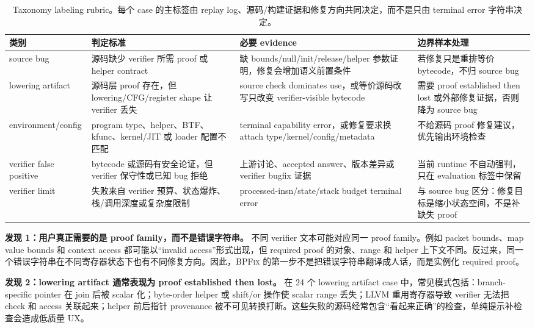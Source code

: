 \documentclass[letterpaper,twocolumn,10pt]{article}
\newcommand{\sys}{\textsc{BPFix}\xspace}
\begin{document}
\begin{table}[t]
\centering
\small
\caption{Taxonomy labeling rubric。每个 case 的主标签由 replay log、源码/构建证据和修复方向共同决定，而不是只由 terminal error 字符串决定。}
\label{tab:taxonomy-rubric}
\begin{tabularx}{\textwidth}{@{}l X X X@{}}
\toprule
类别 & 判定标准 & 必要 evidence & 边界样本处理 \\
\midrule
source bug & 源码缺少 verifier 所需 proof 或 helper contract & 缺 bounds/null/init/release/helper 参数证明，修复会增加语义前置条件 & 若修复只是重排等价 bytecode，不归 source bug \\
lowering artifact & 源码层 proof 存在，但 lowering/CFG/register shape 让 verifier 丢失 & source check dominates use，或等价源码改写只改变 verifier-visible bytecode & 需要 proof established then lost 或外部修复证据，否则降为 source bug \\
environment/config & program type、helper、BTF、kfunc、kernel/JIT 或 loader 配置不匹配 & terminal capability error，或修复要求换 attach type/kernel/config/metadata & 不给源码 proof 修复建议，优先输出环境检查 \\
verifier false positive & bytecode 或源码有安全论证，但 verifier 保守性或已知 bug 拒绝 & 上游讨论、accepted answer、版本差异或 verifier bugfix 证据 & 当前 runtime 不自动强判，只在 evaluation 标签中保留 \\
verifier limit & 失败来自 verifier 预算、状态爆炸、栈/调用深度或复杂度限制 & processed-insn/state/stack budget terminal error & 与 source bug 区分：修复目标是缩小状态空间，不是补缺失 proof \\
\bottomrule
\end{tabularx}
\end{table}

\textbf{发现 1：用户真正需要的是 proof family，而不是错误字符串。}
不同 verifier 文本可能对应同一 proof family。例如 packet bounds、map value bounds 和 context access 都可能以“invalid access”形式出现，但 required proof 的对象、range 和 helper 上下文不同。反过来，同一个错误字符串在不同寄存器状态下也有不同修复方向。因此，\sys 的第一步不是把错误字符串翻译成人话，而是实例化 required proof。

\textbf{发现 2：lowering artifact 通常表现为 proof established then lost。}
在 24 个 lowering artifact case 中，常见模式包括：branch-specific pointer 在 join 后被 scalar 化；byte-order helper 或 shift/or 操作使 scalar range 丢失；LLVM 重用寄存器导致 verifier 无法把 check 和 access 关联起来；helper 前后指针 provenance 被不可见转换打断。这些失败的源码经常包含“看起来正确”的检查，单纯提示补检查会造成低质量 UX。
\end{document}
